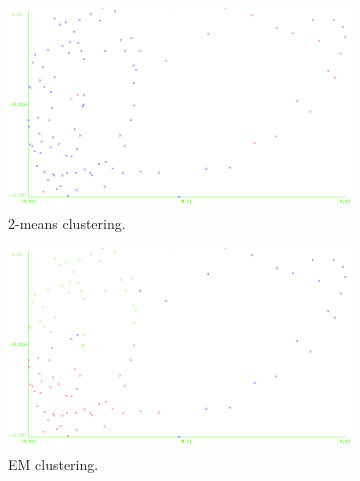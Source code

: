 \documentclass[11pt, letterpaper]{article}            %
\begin{document}
\begin{figure}[htbp]
  \centering
  \begin{subfigure}[b]{0.32\textwidth}
    \includegraphics[width=\textwidth]{./gfx/km15.png}
    \caption{2-means clustering.\label{fig:svavg:km}}
  \end{subfigure}
  \hfill
  \begin{subfigure}[b]{0.32\textwidth}
    \includegraphics[width=\textwidth]{./gfx/em15.png}
    \caption{EM clustering.\label{fig:svavg:em}}
  \end{subfigure}
  \hfill
  \begin{subfigure}[b]{0.32\textwidth}

\end{subfigure}
\end{figure}
\end{document}
